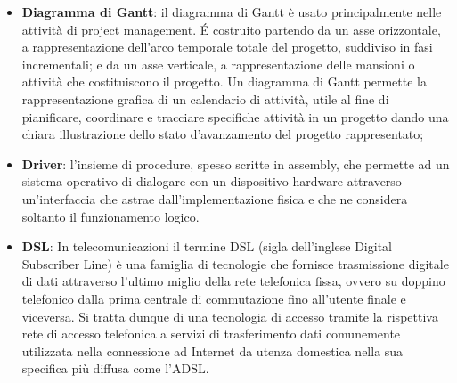 \begin{itemize}
\begin{itemize}
	\end{itemize}
	\item
	\textbf{Diagramma di Gantt}: il diagramma di Gantt è usato principalmente nelle attività di project management. \'E costruito partendo da un asse orizzontale, a rappresentazione dell'arco temporale totale del progetto, suddiviso in fasi incrementali; e da un asse verticale, a rappresentazione delle mansioni o attività che costituiscono il progetto.
	Un diagramma di Gantt permette la rappresentazione grafica di un calendario di attività, utile al fine di pianificare, coordinare e tracciare specifiche attività in un progetto dando una chiara illustrazione dello stato d'avanzamento del progetto rappresentato;

	
	\item
	\textbf{Driver}: l'insieme di procedure, spesso scritte in assembly, che permette ad un sistema operativo di dialogare con un dispositivo hardware attraverso un'interfaccia che astrae dall'implementazione fisica e che ne considera soltanto il funzionamento logico.
	\item
	\textbf{DSL}: In telecomunicazioni il termine DSL (sigla dell'inglese Digital Subscriber Line) è una famiglia di tecnologie che fornisce trasmissione digitale di dati attraverso l'ultimo miglio della rete telefonica fissa, ovvero su doppino telefonico dalla prima centrale di commutazione fino all'utente finale e viceversa.
	Si tratta dunque di una tecnologia di accesso tramite la rispettiva rete di accesso telefonica a servizi di trasferimento dati comunemente utilizzata nella connessione ad Internet da utenza domestica nella sua specifica più diffusa come l'ADSL. 
\end{itemize}
